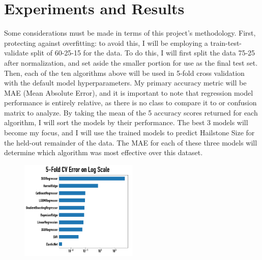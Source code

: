 \documentclass[fleqn,10pt]{SelfArx} %
\begin{document}
\bigskip
\bigskip
\section{Experiments and Results}

Some considerations must be made in terms of this project's methodology. First, protecting against overfitting: to avoid this, I will be employing a train-test-validate split of 60-25-15 for the data. To do this, I will first split the data 75-25 after normalization, and set aside the smaller portion for use as the final test set. Then, each of the ten algorithms above will be used in 5-fold cross validation with the default model hyperparameters. My primary accuracy metric will be MAE (Mean Absolute Error), and it is important to note that regression model performance is entirely relative, as there is no class to compare it to or confusion matrix to analyze. By taking the mean of the 5 accuracy scores returned for each algorithm, I will sort the models by their performance. The best 3 models will become my focus, and I will use the trained models to predict Hailstone Size for the held-out remainder of the data. The MAE for each of these three models will determine which algorithm was most effective over this dataset. 

\begin{figure}[H]
\includegraphics[width=0.5\textwidth, center=8.5cm]{"plots/5-fold.png"} 
\end{figure}
\end{document}
